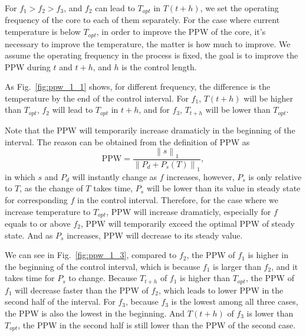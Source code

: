 For $f_{1}>f_{2}>f_{3}$, and $f_{2}$ can lead to $T_{opt}$ in $T(t+h)$, we set the operating frequency of the core to each of them separately. For the case where current temperature is below $T_{opt}$, in order to improve the PPW of the core, it's necessary to improve the temperature, the matter is how much to improve. We assume the operating frequency in the process is fixed, the goal is to improve the PPW during $t$ and $t+h$, and $h$ is the control length. 


As Fig.~\ref{fig:ppw_1_1} shows, for different frequency, the difference is the temperature by the end of the control interval. For $f_{1}$, $T(t+h)$ will be higher than $T_{opt}$, $f_{2}$ will lead to $T_{opt}$ in $t+h$, and for $f_{3}$, $T_{t+h}$ will be lower than $T_{opt}$.



Note that the PPW will temporarily increase dramaticly in the beginning of the interval. The reason can be obtained from the definition of PPW as
\begin{equation}\label{eq:ppw_detail}
\text{PPW} = \frac{\left \| s \right \|_{1}}{\left \| P_{d}+P_{s}(T) \right \|_{1}},
\end{equation}
in which $s$ and $P_{d}$ will instantly change as $f$ increases, however, $P_{s}$ is only relative to $T$, as the change of $T$ takes time, $P_{s}$ will be lower than its value in steady state for corresponding $f$ in the control interval. Therefore, for the case where we increase temperature to $T_{opt}$, PPW will increase dramaticly, especially for $f$ equals to or above $f_{2}$, PPW will temporarily exceed the optimal PPW of steady state. And as $P_{s}$ increases, PPW will decrease to its steady value.

We can see in Fig.~\ref{fig:ppw_1_3}, compared to $f_{2}$, the PPW of $f_{1}$ is higher in the beginning of the control interval, which is because $f_{1}$ is larger than $f_{2}$, and it takes time for $P_{s}$ to change. Because $T_{t+h}$ of $f_{1}$ is higher than $T_{opt}$, the PPW of $f_{1}$ will decrease faster than the PPW of $f_{2}$, which leads to lower PPW in the second half of the interval. For $f_{3}$, because $f_{3}$ is the lowest among all three cases, the PPW is also the lowest in the beginning. And $T(t+h)$ of $f_{3}$ is lower than $T_{opt}$, the PPW in the second half is still lower than the PPW of the second case. 

